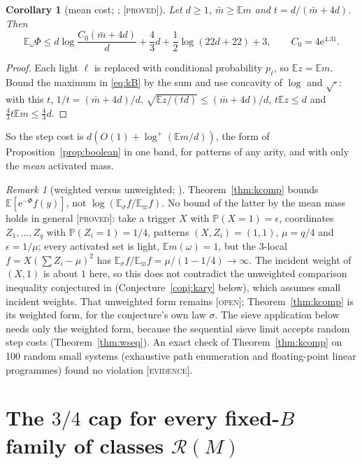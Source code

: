 \documentclass[10pt,reqno]{amsart}
\newtheorem{corollary}[theorem]{Corollary}
\theoremstyle{definition}
\theoremstyle{remark}
\newtheorem{remark}[theorem]{Remark}
\newcommand{\cR}{\mathscr R}
\newcommand{\E}{\mathbb E}
\newcommand{\Prob}{\mathbb P}
\newcommand{\e}{\mathrm e}
\newcommand{\lab}[1]{\textup{[\textsc{#1}]}}
\begin{document}
\begin{corollary}[mean cost; {\cite[Cor.~2.6]{KA}}; \lab{proved}]\label{cor:kmean}
Let $d\geq1$, $\bar m\geq\E m$ and $t=d/(\bar m+4d)$.  Then
\[
 \E_\omega\Phi\leq d\log\frac{C_0(\bar m+4d)}d+\frac43d+\frac12\log(22d+22)+3,\qquad C_0=4\e^{4.31}.
\]
\end{corollary}
\begin{proof}
Each light $\ell$ is replaced with conditional probability $p_\ell$, so
$\E z=\E m$.  Bound the maximum in \eqref{eq:kB} by the sum and use
concavity of $\log$ and $\sqrt\cdot$: with this $t$, $1/t=(\bar m+4d)/d$,
$\sqrt{\E z/(td)}\leq(\bar m+4d)/d$, $t\E z\leq d$ and
$\frac43t\E m\leq\frac43d$.
\end{proof}
So the step cost is $d(O(1)+\log^+(\E m/d))$, the form of
Proposition~\ref{prop:boolean} in one band, for patterns of any arity, and
with only the \emph{mean} activated mass.

\begin{remark}[weighted versus unweighted; {\cite[Remark~2.8, \S5]{KA}}]\label{rem:kweighted}
Theorem~\ref{thm:kcomp} bounds $\E[\e^{-\Phi}f(y)]$, not
$\log(\E_\sigma f/\E_\varpi f)$.  No bound of the latter by the mean mass
holds in general \lab{proved}: take a trigger $X$ with $\Prob(X=1)=\epsilon$,
coordinates $Z_1,\dots,Z_q$ with $\Prob(Z_i=1)=1/4$, patterns
$(X,Z_i)=(1,1)$, $\mu=q/4$ and $\epsilon=1/\mu$; every activated set is light,
$\E m(\omega)=1$, but the $3$-local $f=X(\sum Z_i-\mu)^2$ has
$\E_\sigma f/\E_\varpi f=\mu/(1-1/4)\to\infty$.  The incident weight of
$(X,1)$ is about $1$ here, so this does not contradict the unweighted
comparison inequality conjectured in \cite[Conj.~6.4]{TW}
(Conjecture~\ref{conj:kary} below), which assumes small incident weights.
That unweighted form remains \lab{open}; Theorem~\ref{thm:kcomp} is its
weighted form, for the conjecture's own law $\sigma$.  The sieve
application below needs only the weighted form, because the sequential
sieve limit accepts random step costs (Theorem~\ref{thm:wseq}).  An exact
check of Theorem~\ref{thm:kcomp} on 100 random small systems (exhaustive
path enumeration and floating-point linear programmes) found no violation
\lab{evidence}.
\end{remark}

\section{The \texorpdfstring{$3/4$}{3/4} cap for every fixed-\texorpdfstring{$B$}{B} family of classes \texorpdfstring{$\cR(M)$}{R(M)}}\label{sec:main}
\end{document}
